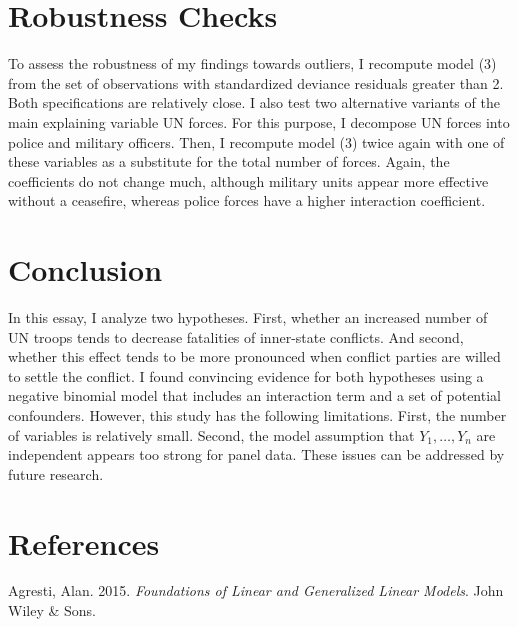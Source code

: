 \documentclass[12pt,english,a4paper,oneside]{article}
\newlength{\cslhangindent}
\newlength{\cslentryspacingunit} %
\newenvironment{CSLReferences}[2] %
 {%
  \setlength{\parindent}{0pt}
  \ifodd #1
  \let\oldpar\par
  \def\par{\hangindent=\cslhangindent\oldpar}
  \fi
  \setlength{\parskip}{#2\cslentryspacingunit}
 }%
 {}
\begin{document}
\hypertarget{robustness-checks}{%
\section{Robustness Checks}\label{robustness-checks}}

To assess the robustness of my findings towards outliers, I recompute model (3) from the set of observations with standardized deviance residuals greater than 2. Both specifications are relatively close. I also test two alternative variants of the main explaining variable UN forces. For this purpose, I decompose UN forces into police and military officers. Then, I recompute model (3) twice again with one of these variables as a substitute for the total number of forces. Again, the coefficients do not change much, although military units appear more effective without a ceasefire, whereas police forces have a higher interaction coefficient.

\hypertarget{conclusion}{%
\section{Conclusion}\label{conclusion}}

In this essay, I analyze two hypotheses. First, whether an increased number of UN troops tends to decrease fatalities of inner-state conflicts. And second, whether this effect tends to be more pronounced when conflict parties are willed to settle the conflict. I found convincing evidence for both hypotheses using a negative binomial model that includes an interaction term and a set of potential confounders. However, this study has the following limitations. First, the number of variables is relatively small. Second, the model assumption that \(Y_1, \dots , Y_n\) are independent appears too strong for panel data. These issues can be addressed by future research.
\newpage

\hypertarget{references}{%
\section*{References}\label{references}}

\singlespacing

\hypertarget{refs}{}
\begin{CSLReferences}{1}{0}
\leavevmode{}%
Agresti, Alan. 2015. \emph{Foundations of Linear and Generalized Linear Models}. John Wiley \& Sons.

\end{CSLReferences}
\end{document}
